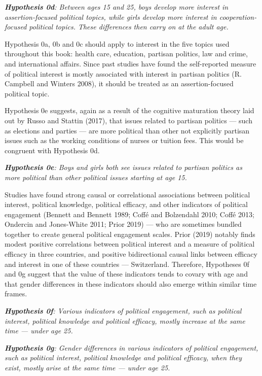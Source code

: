 \documentclass[
  letterpaper,
  DIV=11,
  numbers=noendperiod]{scrreprt}
\begin{document}
\emph{\textbf{Hypothesis 0d}: Between ages 15 and 25, boys develop more
interest in assertion-focused political topics, while girls develop more
interest in cooperation-focused political topics. These differences then
carry on at the adult age.}

Hypothesis 0a, 0b and 0c should apply to interest in the five topics
used throughout this book: health care, education, partisan politics,
law and crime, and international affairs. Since past studies have found
the self-reported measure of political interest is mostly associated
with interest in partisan politics (R. Campbell and Winters 2008), it
should be treated as an assertion-focused political topic.

Hypothesis 0e suggests, again as a result of the cognitive maturation
theory laid out by Russo and Stattin (2017), that issues related to
partisan politics --- such as elections and parties --- are more
political than other not explicitly partisan issues such as the working
conditions of nurses or tuition fees. This would be congruent with
Hypothesis 0d.

\emph{\textbf{Hypothesis 0e}: Boys and girls both see issues related to
partisan politics as more political than other political issues starting
at age 15.}

Studies have found strong causal or correlational associations between
political interest, political knowledge, political efficacy, and other
indicators of political engagement (Bennett and Bennett 1989; Coffé and
Bolzendahl 2010; Coffé 2013; Ondercin and Jones-White 2011; Prior 2019)
--- who are sometimes bundled together to create general political
engagement scales. Prior (2019) notably finds modest positive
correlations between political interest and a measure of political
efficacy in three countries, and positive bidirectional causal links
between efficacy and interest in one of these countries --- Switzerland.
Therefore, Hypotheses 0f and 0g suggest that the value of these
indicators tends to covary with age and that gender differences in these
indicators should also emerge within similar time frames.

\emph{\textbf{Hypothesis 0f}: Various indicators of political
engagement, such as political interest, political knowledge and
political efficacy, mostly increase at the same time --- under age 25.}

\emph{\textbf{Hypothesis 0g}: Gender differences in various indicators
of political engagement, such as political interest, political knowledge
and political efficacy, when they exist, mostly arise at the same time
--- under age 25.}
\end{document}
